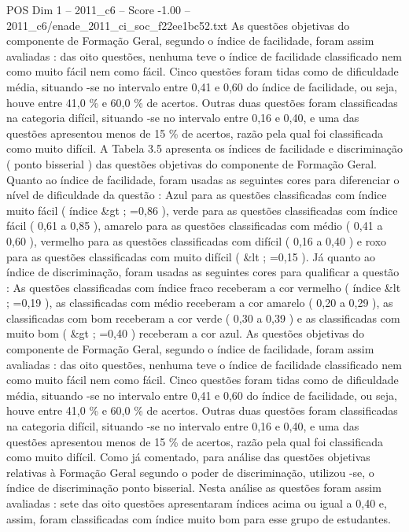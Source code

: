 \begin{textsample}{POS Dim 1 – 2011\_c6 – Score -1.00 – 2011\_c6/enade\_2011\_ci\_soc\_f22ee1bc52.txt}
As questões objetivas do componente de Formação Geral, segundo o índice de facilidade, foram assim avaliadas : das oito questões, nenhuma teve o índice de facilidade classificado nem como muito fácil nem como fácil.
Cinco questões foram tidas como de dificuldade média, situando -se no intervalo entre 0,41 e 0,60 do índice de facilidade, ou seja, houve entre 41,0 \% e 60,0 \% de acertos.
Outras duas questões foram classificadas na categoria difícil, situando -se no intervalo entre 0,16 e 0,40, e uma das questões apresentou menos de 15 \% de acertos, razão pela qual foi classificada como muito difícil.
A Tabela 3.5 apresenta os índices de facilidade e discriminação ( ponto bisserial ) das questões objetivas do componente de Formação Geral.
Quanto ao índice de facilidade, foram usadas as seguintes cores para diferenciar o nível de dificuldade da questão : Azul para as questões classificadas com índice muito fácil ( índice \&gt ; =0,86 ), verde para as questões classificadas com índice fácil ( 0,61 a 0,85 ), amarelo para as questões classificadas com médio ( 0,41 a 0,60 ), vermelho para as questões classificadas com difícil ( 0,16 a 0,40 ) e roxo para as questões classificadas com muito difícil ( \&lt ; =0,15 ).
Já quanto ao índice de discriminação, foram usadas as seguintes cores para qualificar a questão : As questões classificadas com índice fraco receberam a cor vermelho ( índice \&lt ; =0,19 ), as classificadas com médio receberam a cor amarelo ( 0,20 a 0,29 ), as classificadas com bom receberam a cor verde ( 0,30 a 0,39 ) e as classificadas com muito bom ( \&gt ; =0,40 ) receberam a cor azul.
As questões objetivas do componente de Formação Geral, segundo o índice de facilidade, foram assim avaliadas : das oito questões, nenhuma teve o índice de facilidade classificado nem como muito fácil nem como fácil.
Cinco questões foram tidas como de dificuldade média, situando -se no intervalo entre 0,41 e 0,60 do índice de facilidade, ou seja, houve entre 41,0 \% e 60,0 \% de acertos.
Outras duas questões foram classificadas na categoria difícil, situando -se no intervalo entre 0,16 e 0,40, e uma das questões apresentou menos de 15 \% de acertos, razão pela qual foi classificada como muito difícil.
Como já comentado, para análise das questões objetivas relativas à Formação Geral segundo o poder de discriminação, utilizou -se, o índice de discriminação ponto bisserial.
Nesta análise as questões foram assim avaliadas : sete das oito questões apresentaram índices acima ou igual a 0,40 e, assim, foram classificadas com índice muito bom para esse grupo de estudantes.

\end{textsample}
